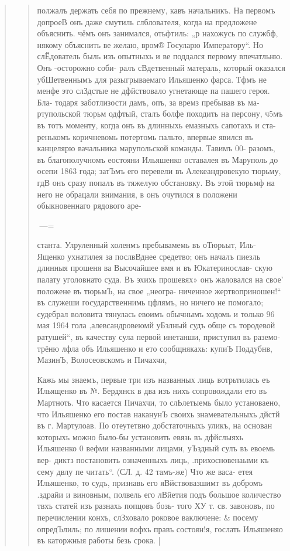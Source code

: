 \begin{quote}
\begin{quote}
полжалъ держать себя по прежнему, кавъ начальникъ. На
первомъ допроеВ онъ даже смутиль слблователя, когда на
предложене объяснить. чёмъ онъ занимался, отьфтиль: „р
нахожусь по службф, някому объяснить ве желаю, вром®
Госуларю Императору“. Но слЁдователь быль изъ опытныхь
и ве поддался первому впечатльню. Онъ -осторожно соби-
ралъ сВдетвенный матераль, который оказался убШетвеннымъ
для разыгрываемаго Ильяшенко фарса. Тфмъ не менфе это
слЗдстые не дфйствовало угнетающе па пашего героя. Бла-
тодаря заботлизости дамъ, опъ, за времз пребывав въ ма-
ртупольской тюрьм%
одфтый, сталъ болфе походить на персону, ч5мъ въ тотъ
моменту, когда онъ въ длинныхь емазныхь сапотахъ и ста-
ренькомъ коричневомь потертомь пальто, впервые явился въ
канцелярю вачальника марупольской команды. Тавимъ 00-
разомъ, въ благополучномъ еостояни Ильяшенко оставалея
въ Маруполь до осепи 1863 года; затЪмъ его перевели въ
Алекеандровекую тюрьму, гдВ онъ сразу попалъ въ тяжелую
обстановку. Въ этой тюрьмф на него не обрацали внимания,
в онъ очутился в положени обыкновеннаго рядового аре-

—=

станта. Улруленный холенмъ пребывамемь въ оТюрьыт, Иль-
Ященко ухнатилея за послвВднее средетво; онъ началъ пиезль
длинныя прошеня ва Высочайшее вмя и въ Юкатеринослав-
скую палату уголовнато суда. Въ эхихь прошевях» онъ
жаловался на свое’ положене въ тюрьмЪ, на свое „неогра-
ниченное жертвоприношен!“ въ служеши государственнимь
цфлямъ, но ничего не помогало; судебрал воловита тянулась
евоимъ обычнымъ ходомь и только 96 мая 1964 гола
‚алевсандровеюмй уБзлный судъ обще съ тородевой ратушей“,
въ качеству сула первой инетанши, приступил въ раземо-
трёню лфла объ Ильяшенко и ето сообщнякахь: купиЪ
Поддубнв, МазинЪ, Волосеовскомъ и Пичахчи,

Кажь мы знаемъ, первые три изъ названных лиць
вотрьтилась еъ Ильященко въ №. Бердянск в два изъ нихъ
сопровождали ето въ Мартноть. Что касается Пичахчи, то
слЬлетыемь было установаено, что Ильяшенко его постав
наканунЪ своихь знамевательныхь дйстй въ г. Мартулоав.
По отеутетвно добстаточныхь уликъ, на основан которыхь
можно было-бы установить евязь въ дфйслыяхь Ильяшенко
0 вефми названными лицами, уЪздный сулъ въ евоемь вер-
диктз постановить означенныхъ лиць, .прихосновенаыми къ
сему двлу пе читать“. (СЛ. д. 42 тамъ-же) Что же васа-
етея Ильяшенко, то судъ, признавь его яВйствовазшимт въ
добромъ .здрайи и виновным, полвель его лВйетия подъ
большое количество твхъ статей изъ разнахь попцовъ бозь-
того ХУ т. св. завоновъ, по перечислении конхъ, слЗховало
роковое ваключене: & посему опредЪлиль; по лишении вофхь
правъ состоян!я, гослать Ильяшеняо въ каторжныя работы
безь срока. |


\end{quote}
\end{quote}
